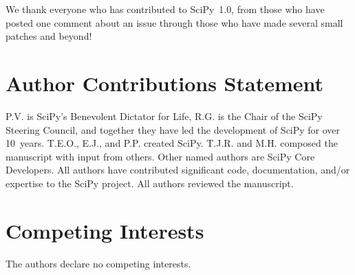 \documentclass[fleqn,10pt]{wlscirep}
\begin{document}
We thank everyone who has contributed to SciPy~1.0, from those who have posted one comment about an issue through those who have made several small patches and beyond!

\section*{Author Contributions Statement}

P.V. is SciPy's Benevolent Dictator for Life, R.G. is the Chair of the SciPy Steering Council, and together they have led the development of SciPy for over 10~years. T.E.O., E.J., and P.P. created SciPy. T.J.R. and M.H. composed the manuscript with input from others. Other named authors are SciPy Core Developers. All authors have contributed significant code, documentation, and/or expertise to the SciPy project. All authors reviewed the manuscript.



\section*{Competing Interests}

The authors declare no competing interests.


\end{document}
